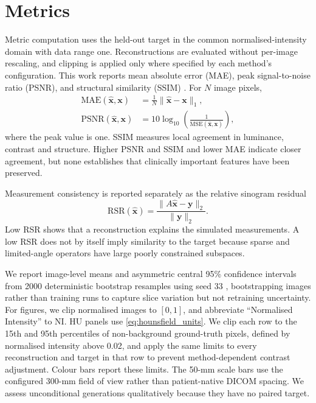 \section{Metrics}

Metric computation uses the held-out target in the common normalised-intensity domain with data range one. Reconstructions are evaluated without per-image rescaling, and clipping is applied only where specified by each method's configuration. This work reports mean absolute error (MAE), peak signal-to-noise ratio (PSNR), and structural similarity (SSIM) \cite{}. For \(N\) image pixels,
\begin{align}
\mathrm{MAE}(\hat{\mathbf{x}},\mathbf{x})
&=\frac{1}{N}\lVert\hat{\mathbf{x}}-\mathbf{x}\rVert_1,\\
\mathrm{PSNR}(\hat{\mathbf{x}},\mathbf{x})
&=10\log_{10}\left(\frac{1}{\mathrm{MSE}(\hat{\mathbf{x}},\mathbf{x})}\right),
\end{align}
where the peak value is one. SSIM measures local agreement in luminance, contrast and structure. Higher PSNR and SSIM and lower MAE indicate closer agreement, but none establishes that clinically important features have been preserved.

Measurement consistency is reported separately as the relative sinogram residual
\begin{equation}
\mathrm{RSR}(\hat{\mathbf{x}})
=
\frac{\lVert A\hat{\mathbf{x}}-\mathbf{y}\rVert_2}
{\lVert\mathbf{y}\rVert_2}.
\end{equation}
Low RSR shows that a reconstruction explains the simulated measurements. A low RSR does not by itself imply similarity to the target because sparse and limited-angle operators have large poorly constrained subspaces.

We report image-level means and asymmetric central 95\% confidence intervals from 2000 deterministic bootstrap resamples using seed 33 \cite{}, bootstrapping images rather than training runs to capture slice variation but not retraining uncertainty. For figures, we clip normalised images to \([0,1]\), and abbreviate ``Normalised Intensity'' to NI. HU panels use \autoref{eq:hounsfield_units}. We clip each row to the 15th and 95th percentiles of non-background ground-truth pixels, defined by normalised intensity above 0.02, and apply the same limits to every reconstruction and target in that row to prevent method-dependent contrast adjustment. Colour bars report these limits. The 50-mm scale bars use the configured 300-mm field of view rather than patient-native DICOM spacing. We assess unconditional generations qualitatively because they have no paired target.
